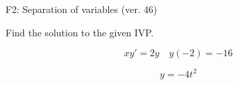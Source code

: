 \begin{exercise}
  \begin{exerciseTitle}F2: Separation of variables (ver. 46)\end{exerciseTitle}
  \begin{exerciseStatement}
    
Find the solution to the given IVP.

    
\[xy'= 2 y \hspace{1em} y( -2 ) = -16\]

  \end{exerciseStatement}
  \begin{exerciseAnswer}
    
\[y= -4 t^ 2\]

  \end{exerciseAnswer}
\end{exercise}